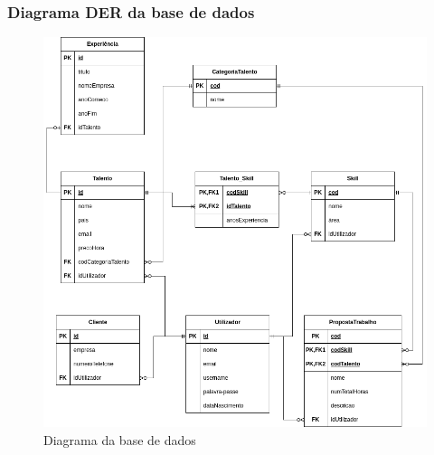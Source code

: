 \subsubsection{Diagrama DER da base de dados}
\begin{figure}[h]
    \centering
    \includegraphics[width=1\linewidth]{imagens/derbd.png}
    \caption{Diagrama da base de dados}
    \label{fig:}
\end{figure}

